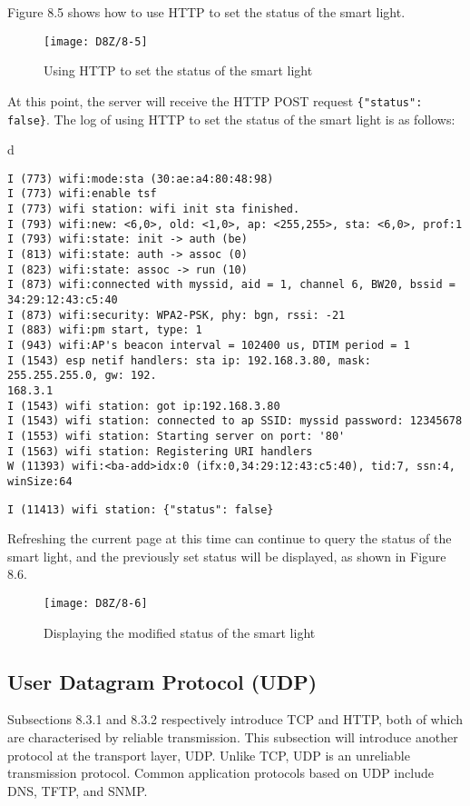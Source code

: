 \documentclass[a4paper,12pt]{book}
\begin{document}
Figure 8.5 shows how to use HTTP to set the status of the smart light.

\begin{figure}[!h]
    \centering
    \texttt{[image: D8Z/8-5]}
    \caption{Using HTTP to set the status of the smart light}
\end{figure}

At this point, the server will receive the HTTP POST request \verb|{"status": false}|. The log of using HTTP to set the status of the smart light is as follows:

\begin{codebloc}
\begin{tabular}{d}
\vspace{2pt}
\begin{verbatim}
I (773) wifi:mode:sta (30:ae:a4:80:48:98)
I (773) wifi:enable tsf 
I (773) wifi station: wifi init sta finished. 
I (793) wifi:new: <6,0>, old: <1,0>, ap: <255,255>, sta: <6,0>, prof:1 
I (793) wifi:state: init -> auth (be) 
I (813) wifi:state: auth -> assoc (0) 
I (823) wifi:state: assoc -> run (10) 
I (873) wifi:connected with myssid, aid = 1, channel 6, BW20, bssid = 
34:29:12:43:c5:40
I (873) wifi:security: WPA2-PSK, phy: bgn, rssi: -21 
I (883) wifi:pm start, type: 1 
I (943) wifi:AP's beacon interval = 102400 us, DTIM period = 1 
I (1543) esp netif handlers: sta ip: 192.168.3.80, mask: 255.255.255.0, gw: 192.
168.3.1
I (1543) wifi station: got ip:192.168.3.80
I (1543) wifi station: connected to ap SSID: myssid password: 12345678
I (1553) wifi station: Starting server on port: '80'
I (1563) wifi station: Registering URI handlers 
W (11393) wifi:<ba-add>idx:0 (ifx:0,34:29:12:43:c5:40), tid:7, ssn:4, winSize:64
\end{verbatim}
\verb|I (11413) wifi station: {"status": false}|
\end{tabular}
\end{codebloc}

Refreshing the current page at this time can continue to query the status of the smart light, and the previously set status will be displayed, as shown in Figure 8.6.

\begin{figure}[!h]
    \centering
    \texttt{[image: D8Z/8-6]}
    \caption{Displaying the modified status of the smart light}
\end{figure}

\subsection{User Datagram Protocol (UDP)}
Subsections 8.3.1 and 8.3.2 respectively introduce TCP and HTTP, both of which are characterised by reliable transmission. This subsection will introduce another protocol at the transport layer, UDP. Unlike TCP, UDP is an unreliable transmission protocol. Common application protocols based on UDP include DNS, TFTP, and SNMP.
\end{document}
